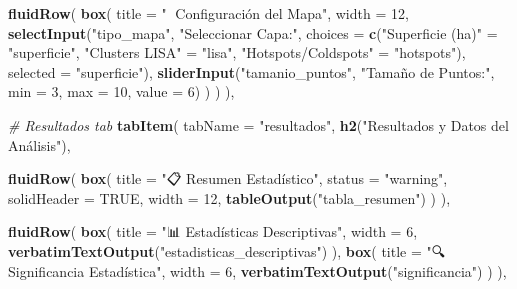 \documentclass[
]{article}
\newenvironment{Shaded}{\begin{snugshade}}{\end{snugshade}}
\newcommand{\AttributeTok}[1]{\textcolor[rgb]{0.13,0.29,0.53}{#1}}
\newcommand{\CommentTok}[1]{\textcolor[rgb]{0.56,0.35,0.01}{\textit{#1}}}
\newcommand{\ConstantTok}[1]{\textcolor[rgb]{0.56,0.35,0.01}{#1}}
\newcommand{\DecValTok}[1]{\textcolor[rgb]{0.00,0.00,0.81}{#1}}
\newcommand{\FunctionTok}[1]{\textcolor[rgb]{0.13,0.29,0.53}{\textbf{#1}}}
\newcommand{\NormalTok}[1]{#1}
\newcommand{\OtherTok}[1]{\textcolor[rgb]{0.56,0.35,0.01}{#1}}
\newcommand{\StringTok}[1]{\textcolor[rgb]{0.31,0.60,0.02}{#1}}
\begin{document}
\begin{Shaded}
\begin{Highlighting}[]
        \FunctionTok{fluidRow}\NormalTok{(}
          \FunctionTok{box}\NormalTok{(}
            \AttributeTok{title =} \StringTok{"🎨 Configuración del Mapa"}\NormalTok{, }
            \AttributeTok{width =} \DecValTok{12}\NormalTok{,}
            \FunctionTok{selectInput}\NormalTok{(}\StringTok{"tipo\_mapa"}\NormalTok{, }\StringTok{"Seleccionar Capa:"}\NormalTok{,}
                        \AttributeTok{choices =} \FunctionTok{c}\NormalTok{(}\StringTok{"Superficie (ha)"} \OtherTok{=} \StringTok{"superficie"}\NormalTok{,}
                                    \StringTok{"Clusters LISA"} \OtherTok{=} \StringTok{"lisa"}\NormalTok{,}
                                    \StringTok{"Hotspots/Coldspots"} \OtherTok{=} \StringTok{"hotspots"}\NormalTok{),}
                        \AttributeTok{selected =} \StringTok{"superficie"}\NormalTok{),}
            \FunctionTok{sliderInput}\NormalTok{(}\StringTok{"tamanio\_puntos"}\NormalTok{, }\StringTok{"Tamaño de Puntos:"}\NormalTok{, }
                        \AttributeTok{min =} \DecValTok{3}\NormalTok{, }\AttributeTok{max =} \DecValTok{10}\NormalTok{, }\AttributeTok{value =} \DecValTok{6}\NormalTok{)}
\NormalTok{          )}
\NormalTok{        )}
\NormalTok{      ),}
      
      \CommentTok{\# Resultados tab}
      \FunctionTok{tabItem}\NormalTok{(}
        \AttributeTok{tabName =} \StringTok{"resultados"}\NormalTok{,}
        \FunctionTok{h2}\NormalTok{(}\StringTok{"Resultados y Datos del Análisis"}\NormalTok{),}
        
        \FunctionTok{fluidRow}\NormalTok{(}
          \FunctionTok{box}\NormalTok{(}
            \AttributeTok{title =} \StringTok{"📋 Resumen Estadístico"}\NormalTok{, }
            \AttributeTok{status =} \StringTok{"warning"}\NormalTok{, }\AttributeTok{solidHeader =} \ConstantTok{TRUE}\NormalTok{,}
            \AttributeTok{width =} \DecValTok{12}\NormalTok{,}
            \FunctionTok{tableOutput}\NormalTok{(}\StringTok{"tabla\_resumen"}\NormalTok{)}
\NormalTok{          )}
\NormalTok{        ),}
        
        \FunctionTok{fluidRow}\NormalTok{(}
          \FunctionTok{box}\NormalTok{(}
            \AttributeTok{title =} \StringTok{"📊 Estadísticas Descriptivas"}\NormalTok{, }
            \AttributeTok{width =} \DecValTok{6}\NormalTok{,}
            \FunctionTok{verbatimTextOutput}\NormalTok{(}\StringTok{"estadisticas\_descriptivas"}\NormalTok{)}
\NormalTok{          ),}
          \FunctionTok{box}\NormalTok{(}
            \AttributeTok{title =} \StringTok{"🔍 Significancia Estadística"}\NormalTok{, }
            \AttributeTok{width =} \DecValTok{6}\NormalTok{,}
            \FunctionTok{verbatimTextOutput}\NormalTok{(}\StringTok{"significancia"}\NormalTok{)}
\NormalTok{          )}
\NormalTok{        ),}
        

\end{Highlighting}
\end{Shaded}
\end{document}

